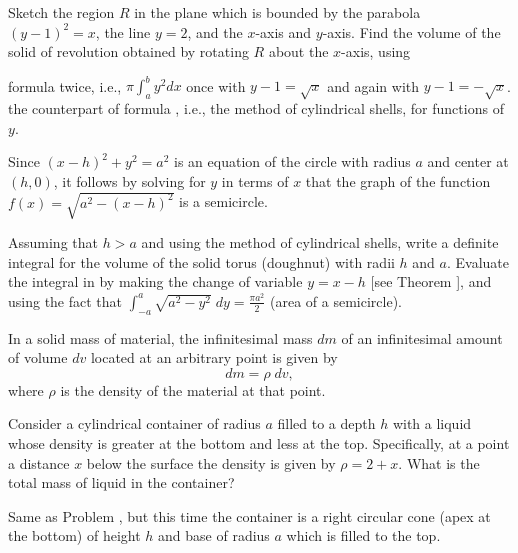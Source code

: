 \begin{exercises}
Sketch the region $R$ in the plane which is
bounded by the parabola $(y-1)^2 = x$,
the line $y=2$, and the $x$-axis and
$y$-axis.  Find the volume of the solid of
revolution obtained by rotating $R$ about
the $x$-axis, using
\begin{exenum}
\x
formula  twice, i.e.,
$\pi \int_a^b y^2dx$ once with $y-1=\sqrt{x}$
and again with $y-1=-\sqrt{x}$.
\x
the counterpart of formula , i.e.,
the method of cylindrical shells,
for functions of $y$.
\end{exenum}

Since $(x-h)^2 + y^2 = a^2$ is an equation
of the circle with radius $a$ and center
at $(h,0)$, it follows by solving for $y$
in terms of $x$ that the graph of the function
$f(x) = \sqrt{a^2-(x-h)^2}$ is a semicircle.
\begin{exenum}
\x
{}
Assuming that $h>a$ and using the method
of cylindrical shells, write a definite integral
for the volume of the solid torus (doughnut)
with radii $h$ and $a$.
\x
Evaluate the integral in  by
making the change of variable $y=x-h$
[see Theorem ],
and using the fact that
$\int_{-a}^a \sqrt{a^2-y^2} \; dy = \frac{\pi a^2}2$
(area of a semicircle).
\end{exenum}

In a solid mass of material, the infinitesimal
mass $dm$ of an infinitesimal amount of volume
$dv$ located at an arbitrary point is given by
\[
dm = \rho \; dv
,
\]
where $\rho$ is the density of the material
at that point.

Consider a cylindrical container of radius $a$
filled to a depth $h$ with a liquid whose
density is greater at the bottom and
less at the top.  Specifically, at a point a distance
$x$ below the surface the density is given by
$\rho = 2 + x$.
What is the total mass of liquid in the container?

Same as Problem ,
but this time the container is a right circular cone
(apex at the bottom) of height $h$ and base
of radius $a$ which is filled to the top.

\end{exercises}

